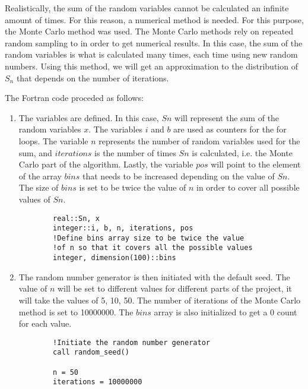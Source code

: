 \documentclass[12pt]{article}
\begin{document}
Realistically, the sum of the random variables cannot be calculated an infinite amount of times. For this reason, a numerical method is needed. For this purpose, the Monte Carlo method was used. The Monte Carlo methods rely on repeated random sampling to in order to get numerical results\cite{ref:monteCarloWiki}. In this case, the sum of the random variables is what is calculated many times, each time using new random numbers. Using this method, we will get an approximation to the distribution of $S_{n}$ that depends on the number of iterations.

The Fortran code proceded as follows:

\begin{enumerate}
	\item The variables are defined. In this case, $Sn$ will represent the sum of the random variables $x$. The variables $i$ and $b$ are used as counters for the for loops. The variable $n$ represents the number of random variables used for the sum, and $iterations$ is the number of times $Sn$ is calculated, i.e. the Monte Carlo part of the algorithm. Lastly, the variable $pos$ will point to the element of the array $bins$ that needs to be increased depending on the value of $Sn$. The size of $bins$ is set to be twice the value of $n$ in order to cover all possible values of $Sn$.
	\begin{lstlisting}
		real::Sn, x
		integer::i, b, n, iterations, pos
		!Define bins array size to be twice the value 
		!of n so that it covers all the possible values
		integer, dimension(100)::bins
	\end{lstlisting}
	\item The random number generator is then initiated with the default seed. The value of $n$ will be set to different values for different parts of the project, it will take the values of 5, 10, 50. The number of iterations of the Monte Carlo method is set to 10000000. The $bins$ array is also initialized to get a 0 count for each value. 
	\begin{lstlisting}
		!Initiate the random number generator
		call random_seed()

		n = 50
		iterations = 10000000


\end{lstlisting}
\end{enumerate}
\end{document}
